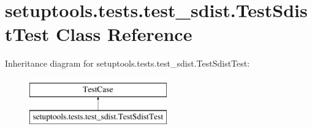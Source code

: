 \hypertarget{classsetuptools_1_1tests_1_1test__sdist_1_1TestSdistTest}{}\section{setuptools.\+tests.\+test\+\_\+sdist.\+Test\+Sdist\+Test Class Reference}
\label{classsetuptools_1_1tests_1_1test__sdist_1_1TestSdistTest}
Inheritance diagram for setuptools.\+tests.\+test\+\_\+sdist.\+Test\+Sdist\+Test\+:\begin{figure}[H]
\begin{center}
\leavevmode
\includegraphics[height=2.000000cm]{classsetuptools_1_1tests_1_1test__sdist_1_1TestSdistTest}
\end{center}
\end{figure}
